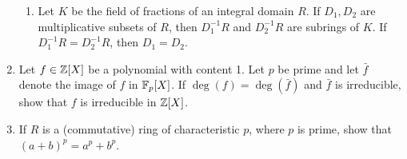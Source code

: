 \documentclass[../psets.tex]{subfiles}
\begin{document}
\begin{enumerate}
\begin{enumerate}
        \item Let $K$ be the field of fractions of an integral domain $R$. If $D_1,D_2$ are multiplicative subsets of $R$, then $D_1^{-1}R$ and $D_2^{-1}R$ are subrings of $K$. If $D_1^{-1}R=D_2^{-1}R$, then $D_1=D_2$.
    \end{enumerate}
    \item Let $f\in\mathbb{Z}[X]$ be a polynomial with content 1. Let $p$ be prime and let $\bar{f}$ denote the image of $f$ in $\mathbb{F}_p[X]$. If $\deg(f)=\deg(\bar{f})$ and $\bar{f}$ is irreducible, show that $f$ is irreducible in $\mathbb{Z}[X]$.
    \item If $R$ is a (commutative) ring of characteristic $p$, where $p$ is prime, show that $(a+b)^p=a^p+b^p$.
\end{enumerate}
\end{document}
